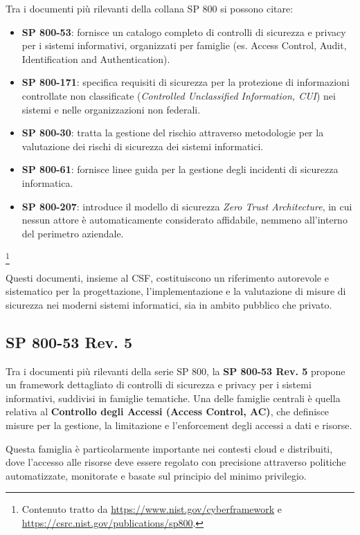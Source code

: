 Tra i documenti più rilevanti della collana SP 800 si possono citare:

\begin{itemize}
    \item \textbf{SP 800-53}: fornisce un catalogo completo di controlli di sicurezza e privacy per i sistemi informativi, organizzati per famiglie (es. Access Control, Audit, Identification and Authentication).
    \item \textbf{SP 800-171}: specifica requisiti di sicurezza per la protezione di informazioni controllate non classificate (\textit{Controlled Unclassified Information, CUI}) nei sistemi e nelle organizzazioni non federali.
    \item \textbf{SP 800-30}: tratta la gestione del rischio attraverso metodologie per la valutazione dei rischi di sicurezza dei sistemi informatici.
    \item \textbf{SP 800-61}: fornisce linee guida per la gestione degli incidenti di sicurezza informatica.
    \item \textbf{SP 800-207}: introduce il modello di sicurezza \textit{Zero Trust Architecture}, in cui nessun attore è automaticamente considerato affidabile, nemmeno all'interno del perimetro aziendale.
\end{itemize}

\footnote{Contenuto tratto da \url{https://www.nist.gov/cyberframework} e \url{https://csrc.nist.gov/publications/sp800}.}

Questi documenti, insieme al CSF, costituiscono un riferimento autorevole e sistematico per la progettazione, l'implementazione e la valutazione di misure di sicurezza nei moderni sistemi informatici, sia in ambito pubblico che privato.


\subsection{SP 800-53 Rev. 5}
\label{sec:nist_sp800_ac}

Tra i documenti più rilevanti della serie SP 800, la \textbf{SP 800-53 Rev. 5} propone un framework dettagliato di controlli di sicurezza e privacy per i sistemi informativi, suddivisi in famiglie tematiche. Una delle famiglie centrali è quella relativa al \textbf{Controllo degli Accessi (Access Control, AC)}, che definisce misure per la gestione, la limitazione e l'enforcement degli accessi a dati e risorse.

Questa famiglia è particolarmente importante nei contesti cloud e distribuiti, dove l'accesso alle risorse deve essere regolato con precisione attraverso politiche automatizzate, monitorate e basate sul principio del minimo privilegio.

